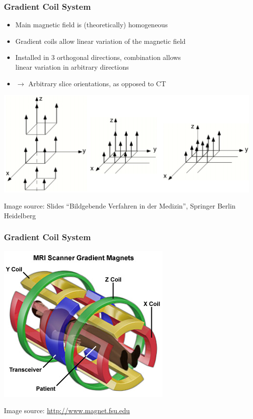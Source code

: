 \begin{frame}
	\frametitle{Gradient Coil System}
	
	\begin{itemize}
		\item Main magnetic field  is (theoretically) homogeneous
		\item Gradient coils allow linear variation of the magnetic field
		\item Installed in 3 orthogonal directions, combination allows \\ linear variation in arbitrary directions
		\item $\rightarrow$ Arbitrary slice orientations, as opposed to CT
	\end{itemize}
	
	\begin{center}
		\includegraphics[height=0.4\textheight]{images/gradients}
		
		{\scriptsize Image source: Slides ``Bildgebende Verfahren in der Medizin'', Springer Berlin Heidelberg}
	\end{center}
	
\end{frame}

\begin{frame}
	\frametitle{Gradient Coil System}
	
	\begin{center}
		\includegraphics[height=0.8\textheight]{images/mri_scannercoils}
	\end{center}
	
	{\scriptsize Image source: \url{http://www.magnet.fsu.edu}}
\end{frame}





